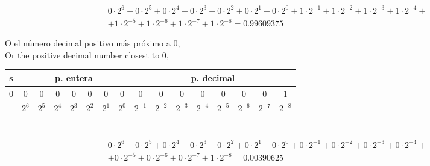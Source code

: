 \begin{equation*}
\begin{split}
&0\cdot 2^6+0 \cdot 2^5+ 0\cdot 2^4+ 0\cdot 2^3+ 0\cdot 2^2 + 0\cdot 2^1 + 0 \cdot 2^0 + 1 \cdot 2^{-1}+ 1 \cdot 2^{-2}+ 1 \cdot 2^{-3}+ 1 \cdot 2^{-4}+ \\
&+1 \cdot 2^{-5}+1 \cdot 2^{-6} +1 \cdot 2^{-7}+1 \cdot 2^{-8} =  0.99609375
\end{split}
\end{equation*}

\begin{paracol}{2}
O el número decimal positivo más próximo a 0,\\
\switchcolumn
Or the positive decimal number closest to 0,
\end{paracol}

\begin{tabular}{|c||c|c|c|c|c|c|c||c|c|c|c|c|c|c|c|}
\hline
s&\multicolumn{7}{c||}{p. entera}&\multicolumn{8}{c|}{p. decimal}\\
\hline
0&0&0&0&0&0&0&0&0&0&0&0&0&0&0&1\\
\hline
&$2^{6}$&$2^{5}$&$2^{4}$&$2^{3}$&$2^{2}$&$2^{1}$&$2^{0}$&$2^{-1}$&$2^{-2}$&$2^{-3}$&$2^{-4}$&$2^{-5}$&$2^{-6}$&$2^{-7}$&$2^{-8}$\\
\hline
\end{tabular}\\

\begin{equation*}
\begin{split}
&0\cdot 2^6+0 \cdot 2^5+ 0\cdot 2^4+ 0\cdot 2^3+ 0\cdot 2^2 + 0\cdot 2^1 + 0 \cdot 2^0 + 0 \cdot 2^{-1}+ 0 \cdot 2^{-2}+ 0 \cdot 2^{-3}+0 \cdot 2^{-4}+\\
&+ 0 \cdot 2^{-5}+0 \cdot 2^{-6} +0 \cdot 2^{-7}+1 \cdot 2^{-8} =  0.00390625
\end{split}
\end{equation*}

